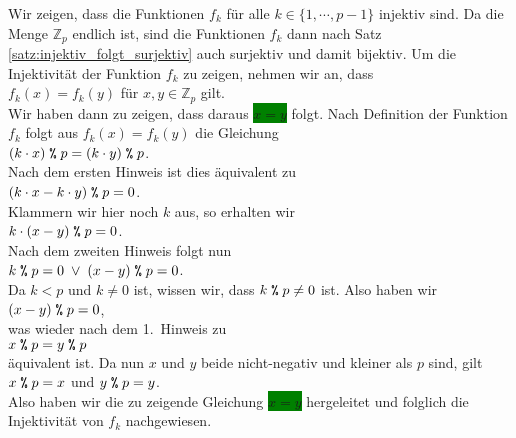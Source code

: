 \solution
Wir zeigen, dass die Funktionen $f_k$ f\"{u}r alle $k \in \{1, \cdots, p-1\}$ injektiv sind.  Da die
Menge $\mathbb{Z}_p$ endlich ist, sind die Funktionen $f_k$ dann nach Satz \ref{satz:injektiv_folgt_surjektiv} 
auch surjektiv und damit bijektiv.  Um die Injektivit\"{a}t der Funktion $f_k$ zu zeigen, nehmen wir
an, dass
\\[0.2cm]
\hspace*{1.3cm}
$f_k(x) = f_k(y)$ \quad f\"{u}r $x,y \in \mathbb{Z}_p$ gilt.
\\[0.2cm]
Wir haben dann zu zeigen, dass daraus \colorbox{green}{$x = y$} folgt.  Nach Definition der Funktion $f_k$ folgt aus
$f_k(x) = f_k(y)$ die Gleichung
\\[0.2cm]
\hspace*{1.3cm}
$(k \cdot x) \;\texttt{\symbol{37}}\;p = (k \cdot y) \;\texttt{\symbol{37}}\;p$.
\\[0.2cm]
Nach dem ersten Hinweis ist dies \"{a}quivalent zu 
\\[0.2cm]
\hspace*{1.3cm}
$(k \cdot x - k \cdot y) \;\texttt{\symbol{37}}\;p = 0$.
\\[0.2cm]
Klammern wir hier noch $k$ aus, so erhalten wir
\\[0.2cm]
\hspace*{1.3cm}
$k \cdot (x - y) \;\texttt{\symbol{37}}\;p = 0$.
\\[0.2cm]
Nach dem zweiten Hinweis folgt nun
\\[0.2cm]
\hspace*{1.3cm}
$k \;\texttt{\symbol{37}}\;p = 0 \;\vee\; (x - y) \;\texttt{\symbol{37}}\;p = 0$.
\\[0.2cm]
Da $k < p$ und $k \not= 0$ ist, wissen wir, dass $k \;\texttt{\symbol{37}}\;p \not= 0$ ist.  Also haben wir
\\[0.2cm]
\hspace*{1.3cm}
$(x - y) \;\texttt{\symbol{37}}\;p = 0$,
\\[0.2cm]
was wieder nach dem 1.~Hinweis zu
\\[0.2cm]
\hspace*{1.3cm}
$x \;\texttt{\symbol{37}}\;p = y \;\texttt{\symbol{37}}\;p$
\\[0.2cm]
\"{a}quivalent ist.  Da nun $x$ und $y$ beide nicht-negativ und kleiner als $p$ sind, gilt
\\[0.2cm]
\hspace*{1.3cm}
$x \;\texttt{\symbol{37}}\;p = x$ \quad und $y \;\texttt{\symbol{37}}\;p = y$.
\\[0.2cm]
Also haben wir die zu zeigende Gleichung \colorbox{green}{$x = y$} 
hergeleitet und folglich die Injektivit\"{a}t von $f_k$ nachgewiesen.  \qeds


